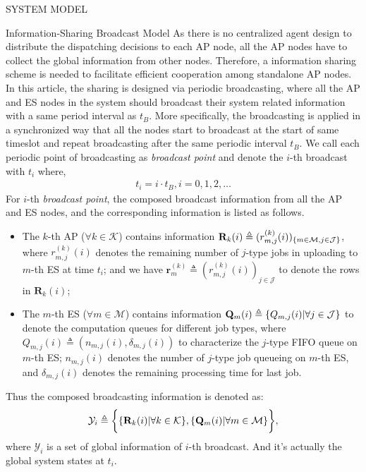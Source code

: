 \documentclass[10pt, conference, letterpaper]{IEEEtran}
\newcommand{\mat}{\mathbf}
\newcommand{\define}{\triangleq}
\renewcommand{\vec}{\mathbf}
\DeclarePairedDelimiter{\set}{\{}{\}}
\DeclarePairedDelimiter{\Brace}{\bigg\{}{\bigg\}}
\newcommand{\apSet}{\mathcal{K}}
\newcommand{\esSet}{\mathcal{M}}
\newcommand{\jSpace}{\mathcal{J}}
\newcommand{\Obsv}{\mathcal{Y}}
\begin{document}
\begin{section}{SYSTEM MODEL}
        \begin{subsection}{Information-Sharing Broadcast Model}
            As there is no centralized agent design to distribute the dispatching decisions to each AP node, all the AP nodes have to collect the global information from other nodes. Therefore, a information sharing scheme is needed to facilitate efficient cooperation among standalone AP nodes.
            In this article, the sharing is designed via periodic broadcasting, where all the AP and ES nodes in the system should broadcast their system related information with a same period interval as $t_B$. More specifically, the broadcasting is applied in a synchronized way that all the nodes start to broadcast at the start of same timeslot and repeat broadcasting after the same periodic interval $t_B$. We call each periodic point of broadcasting as \emph{broadcast point} and denote the $i$-th broadcast with $t_i$ where,
            \begin{align}
                t_i = i \cdot t_B, i=0,1,2,\dots
            \end{align}
            For $i$-th \emph{broadcast point}, the composed broadcast information from all the AP and ES nodes, and the corresponding information is listed as follows.
            \begin{itemize}
                \item The $k$-th AP ($\forall k\in\apSet$) contains information $\mat{R}_k(i) \define (r^{(k)}_{m,j}(i))_{\set{m\in\esSet,j\in\jSpace}}$, where $r^{(k)}_{m,j}(i)$ denotes the remaining number of $j$-type jobs in uploading to $m$-th ES at time $t_i$; and we have $\vec{r}^{(k)}_{m} \define (r^{(k)}_{m,j}(i))_{j\in\jSpace}$ to denote the rows in $\vec{R}_k(i)$; %
                \item The $m$-th ES ($\forall m\in\esSet$) contains information $\vec{Q}_m(i) \define \set{Q_{m,j}(i)|\forall j\in\jSpace}$ to denote the computation queues for different job types, where $Q_{m,j}(i) \define (n_{m,j}(i), \delta_{m,j}(i))$ to characterize the $j$-type FIFO queue on $m$-th ES; $n_{m,j}(i)$ denotes the number of $j$-type job queueing on $m$-th ES, and $\delta_{m,j}(i)$ denotes the remaining processing time for last job.
            \end{itemize}
            Thus the composed broadcasting information is denoted as:
            \begin{align}
                \Obsv_i \define
                        \Brace{
                            \set{\mat{R}_{k}(i)|\forall k\in\apSet},
                            \set{\vec{Q}_m(i)|\forall m\in\esSet}
                        },
            \end{align}
            where $\Obsv_i$ is a set of global information of $i$-th broadcast. And it's actually the global system states at $t_i$.


\end{subsection}
\end{section}
\end{document}
